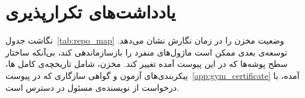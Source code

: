 \section{یادداشت‌های تکرارپذیری}
\label{subsec:repo_reproducibility}

نگاشت جدول~\ref{tab:repo_map} وضعیت مخزن را در زمان نگارش نشان
می‌دهد. توسعه‌ی بعدی ممکن است ماژول‌های منفرد را بازسازماندهی کند،
بی‌آنکه ساختار سطح پوشه‌ها که در این پیوست آمده تغییر کند. مخزن،
شامل تاریخچه‌ی کامل ها، پیکربندی‌های آزمون و گواهی
سازگاری  که در پیوست~\ref{app:gym_certificate} آمده،
با درخواست از نویسنده‌ی مسئول در دسترس است.